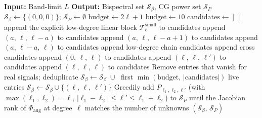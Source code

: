 \documentclass{article}
\theoremstyle{definition}
\theoremstyle{remark}
\newcommand{\SO}{\mathrm{SO}}
\theoremstyle{definition}
\begin{document}
\begin{algorithm}[t]
\caption{Augmented selective index set for the $\SO(3)$ bispectrum
  on $S^2$ at band-limit~$L$. Returns bispectral triples
  $\mathcal{S}_\beta$ and CG power triples $\mathcal{S}_P$.}
\label{alg:so3-augmented}
\small
\begin{algorithmic}[1]
\STATE \textbf{Input:} Band-limit $L$
\STATE \textbf{Output:} Bispectral set $\mathcal{S}_\beta$, CG power
  set $\mathcal{S}_P$
\STATE $\mathcal{S}_\beta \leftarrow \{(0,0,0)\}$;
  $\mathcal{S}_P \leftarrow \emptyset$
  \STATE $\text{budget} \leftarrow 2\ell + 1$
    \STATE $\text{budget} \leftarrow 10$
  \ENDIF
  \STATE $\text{candidates} \leftarrow [\,]$
    \STATE append the explicit low-degree linear block
      $\mathcal{T}^{\mathrm{small}}_\ell$ to candidates
      \STATE append $(a,\, \ell,\, \ell{-}a)$ to candidates
    \ENDFOR
      \STATE append $(a,\, \ell,\, \ell{-}a{+}1)$ to candidates
    \ENDFOR
      \STATE append $(a,\, \ell{-}a,\, \ell)$ to candidates
    \ENDFOR
  \ELSE
    \STATE append low-degree chain candidates
      \STATE append cross candidates
    \ENDIF
  \ENDIF
  \STATE append $(0,\, \ell,\, \ell)$ to candidates
      \STATE append $(\ell,\, \ell,\, \ell')$ to candidates
    \ENDFOR
  \ENDIF
    \STATE append $(\ell,\, \ell,\, \ell)$ to candidates
  \ENDIF
  \STATE Remove entries that vanish for real signals; deduplicate
  \STATE $\mathcal{S}_\beta \leftarrow \mathcal{S}_\beta
    \;\cup\;$ first $\min(\text{budget},\,
    |\text{candidates}|)$ live entries
  \STATE {}
    \STATE $\mathcal{S}_\beta \leftarrow \mathcal{S}_\beta
      \cup \{(\ell,\, \ell,\, \ell')\}$
  \ENDFOR
  \STATE {}
  \STATE Greedily add $P_{\ell_1,\ell_2,\ell'}$ (with
    $\max(\ell_1,\ell_2) = \ell$, $|\ell_1{-}\ell_2| \le \ell'
    \le \ell_1{+}\ell_2$) to $\mathcal{S}_P$ until the
    Jacobian rank of $\Phi_{\mathrm{aug}}$ at degree~$\ell$
    matches the number of unknowns
\ENDFOR
\RETURN $(\mathcal{S}_\beta,\, \mathcal{S}_P)$
\end{algorithmic}
\end{algorithm}
\end{document}
